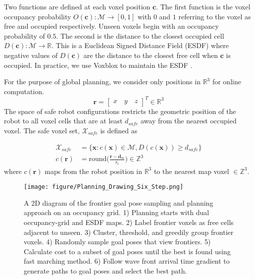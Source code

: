 \documentclass[letterpaper, 10 pt, conference]{ieeeconf}  %
\begin{document}
Two functions are defined at each voxel position $\bm{c}$. The first function is the voxel occupancy probability $O(\bm{c}): \mathcal{M} \rightarrow [0,1]$ with $0$ and $1$ referring to the voxel as free and occupied respectively. Unseen voxels begin with an occupancy probability of $0.5$.  The second is the distance to the closest occupied cell $D(\bm{c}): \mathcal{M} \rightarrow \mathbb{R}$.  This is a Euclidean Signed Distance Field (ESDF) where negative values of $D(\bm{c})$ are the distance to the closest free cell when $\bm{c}$ is occupied. In practice, we use Voxblox to maintain the ESDF \cite{oleynikova2017voxblox}.

For the purpose of global planning, we consider only positions in $\mathbb{R}^3$ for online computation.  
\begin{equation}
    \bm{r} = \begin{bmatrix}
    x \quad y \quad z
    \end{bmatrix}^T \in \mathbb{R}^3
\label{eq_state}
\end{equation}
The space of safe robot configurations restricts the geometric position of the robot to all voxel cells that are at least $d_{safe}$ away from the nearest occupied voxel.  The safe voxel set, $\mathcal{X}_{safe}$ is defined as

\begin{equation}
\begin{aligned}
    \mathcal{X}_{safe} &= \{ \bm{x} : c(\bm{x}) \in \mathcal{M}, D(c(\bm{x})) \geq d_{safe} \} \\
    c(\bm{r}) &= \text{round} \bigg( \frac{\bm{r} - \bm{d}_m}{s_c} \bigg) \in \mathbb{Z}^3
\end{aligned}
\label{eq_state_configuration}
\end{equation}
where $c(\bm{r})$ maps from the robot position in $\mathbb{R}^3$ to the nearest map voxel $\in \mathbb{Z}^3$.

\begin{figure}
    \centering
    \texttt{[image: figure/Planning\_Drawing\_Six\_Step.png]}
    \caption{A 2D diagram of the frontier goal pose sampling and planning approach on an occupancy grid.  1) Planning starts with dual occupancy-grid and ESDF maps.  2) Label frontier voxels as free cells adjacent to unseen.  3) Cluster, threshold, and greedily group frontier voxels.  4) Randomly sample goal poses that view frontiers.  5) Calculate cost to a subset of goal poses until the best is found using fast marching method.  6) Follow wave front arrival time gradient to generate paths to goal poses and select the best path.} \label{fig_plan_6step}
\end{figure}
\end{document}
